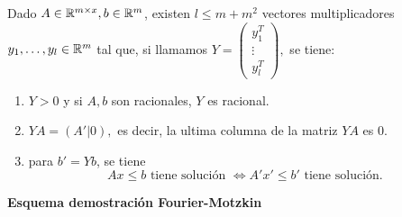 \begin{teo}
Dado $A \in \mathbb{R}^{m \times x}, b \in \mathbb{R}^m$, existen $l \le m + m^2$ vectores multiplicadores $y_1, \ldots, y_l \in \mathbb{R}^m$ tal que, si llamamos
$Y =
\left(
    \begin{array}{c}
         y_1^T\\
         \vdots\\
         y_l^T
    \end{array}
    \right),$ se tiene:
\begin{enumerate}
    \item $Y > 0$ y si $A, b$ son racionales, $Y$ es racional.
    \item $Y A = (A'|0),$ es decir, la ultima columna de la matriz $Y A$ es 0.
    \item para $b'=Yb$, se tiene $$Ax \le b \text{ tiene solución } \Longleftrightarrow A'x' \le b' \text{ tiene solución}.$$
\end{enumerate}
\end{teo}
\textbf{Esquema demostración Fourier-Motzkin}
